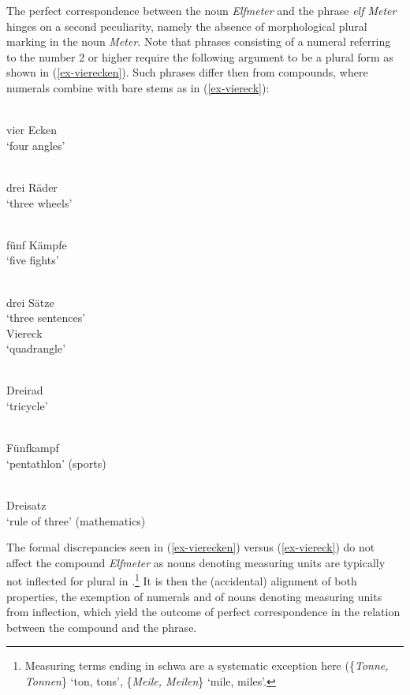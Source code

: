 \documentclass[output=paper
 ,nobabel
 ,draftmode
 ,colorlinks, citecolor=brown
]{langscibook}
\begin{document}
The perfect correspondence between the noun \emph{Elfmeter} and the phrase \emph{elf Meter} hinges on a second peculiarity, namely the absence of morphological plural marking in the noun \emph{Meter}. Note that phrases consisting of a numeral referring to the number 2 or higher require the following argument to be a plural form as shown in (\ref{ex-vierecken}). Such phrases differ then from compounds, where numerals combine with bare stems as in (\ref{ex-viereck}):

\begin{multicols}{2}
\ea\label{ex-vierecken}
\ea {[ˌfiʀˈɛkən]}\\
vier Ecken\\
`four angles'

\ex {[ˌdʀaiˈʀædəʀ]}\\
drei Räder\\
`three wheels'

\\
fünf Kämpfe\\
`five fights'

\\
drei Sätze\\
`three sentences'
\z
%
\columnbreak
%
\ex\label{ex-viereck}
\ea {[ˈfiʀˌɛk]}\\
Viereck\\
`quadrangle'

\ex {[ˈdʀaiˌʀɑd]}\\
Dreirad\\
`tricycle'

\\
Fünfkampf\\
`pentathlon' (sports)

\\
Dreisatz\\
`rule of three' (mathematics)
\z
\z
\end{multicols}

\noindent
The formal discrepancies seen in (\ref{ex-vierecken}) versus (\ref{ex-viereck}) do not affect the
compound \emph{Elfmeter} as nouns denoting measuring units are typically not inflected for plural in
.\footnote{Measuring terms ending in schwa are a systematic exception here (\eg \{\emph{Tonne,
    Tonnen}\} `ton, tons', \{\emph{Meile, Meilen}\} `mile, miles'.} It is then the (accidental)
alignment of both properties, the exemption of numerals and of nouns denoting measuring units from
inflection, which yield the outcome of perfect correspondence in the relation between the compound
and the phrase. 
\end{document}
